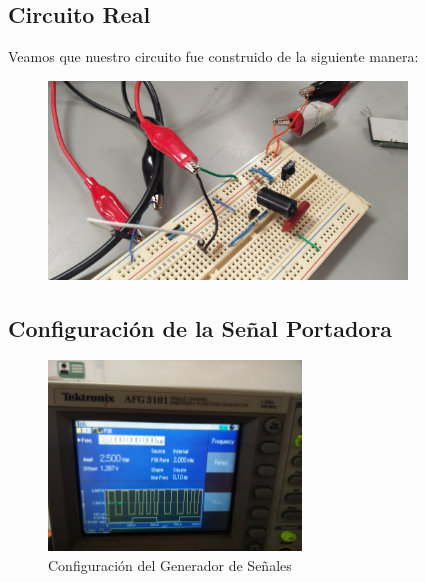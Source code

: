 \documentclass[12pt, fleqn]{article}                            %
\theoremstyle{break}                                            %
\begin{document}
  

    \vspace{1em}
    \subsection{Circuito Real}

        Veamos que nuestro circuito fue construido de la siguiente manera:
        \begin{figure}[h]
            \centering
            \includegraphics[width=0.85\textwidth]{CircuitoGeneral1}
        \end{figure}


    \clearpage
    \subsection{Configuración de la Señal Portadora}

        \begin{figure}[h]
            \centering
            \includegraphics[width=0.6\textwidth]{Signal1}
            \caption{Configuración del Generador de Señales}
        \end{figure}
\end{document}
